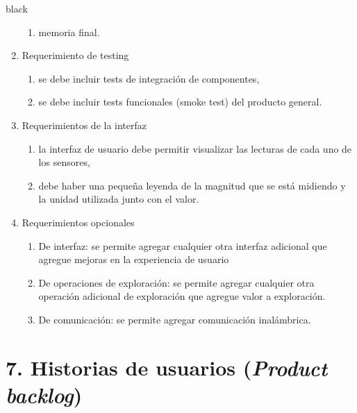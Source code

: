 \documentclass[
11pt, %
]{charter}
\begin{document}
\begin{consigna}{black}
\begin{enumerate}
\begin{enumerate}
			\item memoria final.	
		\end{enumerate}	
	\item Requerimiento de testing		
		\begin{enumerate}			
			\item se debe incluir tests de integración de componentes,
			\item se debe incluir tests funcionales (smoke test) del producto general.		
		\end{enumerate}	
	\item Requerimientos de la interfaz		
		\begin{enumerate}			
			\item la interfaz de usuario debe permitir visualizar las lecturas de cada uno de los sensores,			
			\item debe haber una pequeña leyenda de la magnitud que se está midiendo y la unidad utilizada junto con el valor.		
		\end{enumerate}	
	\item Requerimientos opcionales		
		\begin{enumerate}			
			\item De interfaz: se permite agregar cualquier otra interfaz adicional que agregue mejoras en la experiencia de usuario			
			\item De operaciones de exploración: se permite agregar cualquier otra operación adicional de exploración que agregue valor a exploración.	
			\item De comunicación: se permite agregar comunicación inalámbrica.		
	\end{enumerate}
\end{enumerate}




\end{consigna}

\section{7. Historias de usuarios (\textit{Product backlog})}
\label{sec:backlog}
\end{document}

